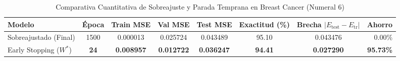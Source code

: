 \begin{table}[htbp]
    \centering
    \small
    \caption{Comparativa Cuantitativa de Sobreajuste y Parada Temprana en Breast Cancer (Numeral 6)}
    \label{tab:sobreajuste_early_stopping}
    \begin{adjustbox}{max width=\textwidth}
    \begin{tabular}{lccccccr}
        \toprule
        \textbf{Modelo} & \textbf{Época} & \textbf{Train MSE} & \textbf{Val MSE} & \textbf{Test MSE} & \textbf{Exactitud (\%)} & \textbf{Brecha $|E_{\text{test}}-E_{\text{tr}}|$} & \textbf{Ahorro} \\
        \midrule
        Sobreajustado (Final)    & 1500 & 0.000013 & 0.025724 & 0.043489 & 95.10 & 0.043476 & 0.00\% \\
        Early Stopping ($W^*$)   & \textbf{24}  & \textbf{0.008957} & \textbf{0.012722} & \textbf{0.036247} & \textbf{94.41} & \textbf{0.027290} & \textbf{95.73\%} \\
        \bottomrule
    \end{tabular}
    \end{adjustbox}
\end{table}
